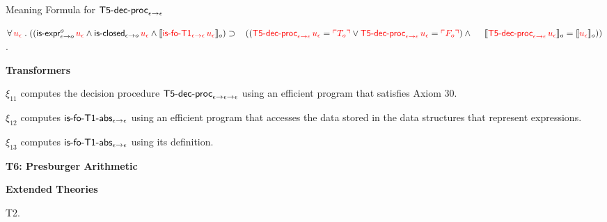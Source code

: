 \documentclass[fleqn,11pt]{article}
\begin{document}
    \item Meaning Formula for $\mbox{\sf T5-dec-proc}_{\epsilon \rightarrow \epsilon}$

    $\forall\, \textcolor{red}{u_\epsilon} \mathrel. 
     ((\mbox{\sf is-expr}_{\epsilon \rightarrow o}^{o} \, 
     \textcolor{red}{u_\epsilon} \wedge
     \mbox{\sf is-closed}_{\epsilon \rightarrow o} \, \textcolor{red}{u_\epsilon} \wedge 
     \llbracket\textcolor{red}{\mbox{\sf is-fo-T1}_{\epsilon \rightarrow \epsilon} \, 
     u_\epsilon}\rrbracket_o) \supset {}\\
     \hspace*{2ex}((\textcolor{red}{\mbox{\sf T5-dec-proc}_{\epsilon \rightarrow \epsilon} \, u_\epsilon} = 
     \textcolor{red}{\ulcorner T_o\urcorner} \vee 
     \textcolor{red}{\mbox{\sf T5-dec-proc}_{\epsilon \rightarrow \epsilon} \, u_\epsilon} = 
     \textcolor{red}{\ulcorner F_o\urcorner}) \wedge {}\\
     \hspace*{3.1ex}
     \llbracket\textcolor{red}{\mbox{\sf T5-dec-proc}_{\epsilon \rightarrow \epsilon} \, u_\epsilon}\rrbracket_o =
     \llbracket\textcolor{red}{u_\epsilon}\rrbracket_o))$.

  \ee

  \item[] \textbf{Transformers}

  \be

    \setcounter{enumi}{10}

    \item $\xi_{11}$ computes the decision procedure
      $\mbox{\sf T5-dec-proc}_{\epsilon \rightarrow \epsilon \rightarrow
      \epsilon}$ using an efficient program that satisfies
      Axiom 30.


    \item $\xi_{12}$ computes $\mbox{\sf is-fo-T1-abs}_{\epsilon \rightarrow
      \epsilon}$ using an efficient program that accesses the data
      stored in the data structures that represent expressions.

    \item $\xi_{13}$ computes $\mbox{\sf is-fo-T1-abs}_{\epsilon \rightarrow
      \epsilon}$ using its definition.

  \ee

\ei

\noindent
\textbf{T6: Presburger Arithmetic}

\bi

  \item[] \textbf{Extended Theories} 

  \be

    \setcounter{enumi}{1}

    \item T2.
\end{document}
